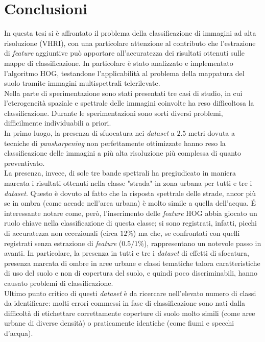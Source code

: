 

\chapter{Conclusioni}
\label{cap:conclusioni}

In questa tesi si è affrontato il problema della classificazione di immagini ad alta risoluzione (VHRI), con una particolare attenzione al contributo che l'estrazione di \emph{feature} aggiuntive può apportare all'accuratezza dei risultati ottenuti sulle mappe di classificazione.
In particolare è stato analizzato e implementato l'algoritmo HOG, testandone l'applicabilità al problema della mappatura del suolo tramite immagini multispettrali telerilevate.\\
Nella parte di sperimentazione sono stati presentati tre casi di studio, in cui l'eterogeneità spaziale e spettrale delle immagini coinvolte ha reso difficoltosa la classificazione.
Durante le sperimentazioni sono sorti diversi problemi, difficilmente individuabili a priori. \\
In primo luogo, la presenza di sfuocatura nei \emph{dataset} a $2.5$ metri dovuta a tecniche di \emph{pansharpening} non perfettamente ottimizzate hanno reso la classificazione delle immagini a più alta risoluzione più complessa di quanto preventivato.\\
La presenza, invece, di sole tre bande spettrali ha pregiudicato in maniera marcata i risultati ottenuti nella classe "strada" in zona urbana per tutti e tre i \emph{dataset}. Questo è dovuto al fatto che la risposta spettrale delle strade, ancor più se in ombra (come accade nell'area urbana) è molto simile a quella dell'acqua. \'E interessante notare come, però, l'inserimento delle \emph{feature} HOG abbia giocato un ruolo chiave nella classificazione di questa classe; si sono registrati, infatti, picchi di accuratezza non eccezionali (circa $12\%$) ma che, se confrontati con quelli registrati senza estrazione di \emph{feature} ($0.5/1\%$), rappresentano un notevole passo in avanti. 
In particolare, la presenza in tutti e tre i \emph{dataset} di effetti di sfocatura, presenza marcata di ombre in aree urbane e classi tematiche talora caratteristiche di uso del suolo e non di copertura del suolo, e quindi poco discriminabili, hanno causato problemi di classificazione. \\
Ultimo punto critico di questi \emph{dataset} è da ricercare nell'elevato numero di classi da identificare: molti errori commessi in fase di classificazione sono nati dalla difficoltà di etichettare correttamente coperture di suolo molto simili (come aree urbane di diverse densità) o praticamente identiche (come fiumi e specchi d'acqua).\\


